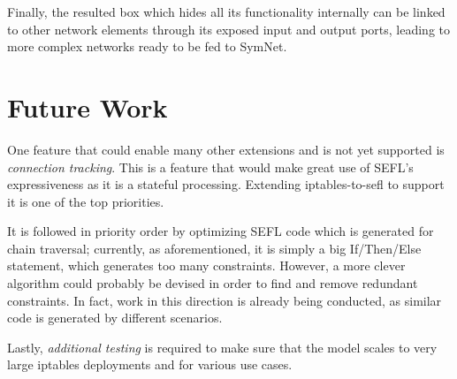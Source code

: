 \documentclass[twoside, 11pt, a4paper]{article}
\begin{document}
Finally, the resulted box which hides all its functionality internally can be
linked to other network elements through its exposed input and output ports,
leading to more complex networks ready to be fed to SymNet.

\section{Future Work}
One feature that could enable many other extensions and is not yet supported is
\emph{connection tracking}.  This is a feature that would make great use of
SEFL's expressiveness as it is a stateful processing.  Extending
iptables-to-sefl to support it is one of the top priorities.

It is followed in priority order by optimizing SEFL code which is generated for
chain traversal; currently, as aforementioned, it is simply a big If/Then/Else
statement, which generates too many constraints.  However, a more clever
algorithm could probably be devised in order to find and remove redundant
constraints.  In fact, work in this direction is already being conducted, as
similar code is generated by different scenarios.

Lastly, \emph{additional testing} is required to make sure that the model
scales to very large iptables deployments and for various use cases.

\vskip 0.2in


\end{document}
